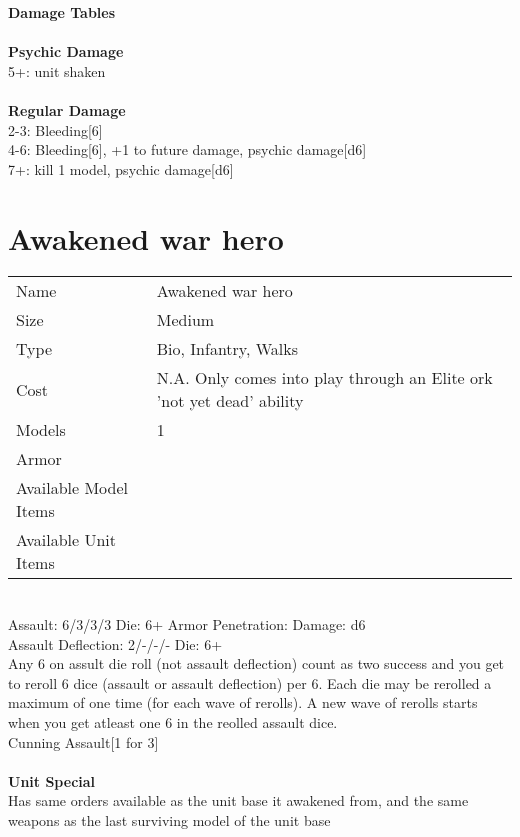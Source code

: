 {\bf Damage Tables} \\
\ \\ {\bf Psychic Damage } \\
5+: unit shaken \\
\ \\ {\bf Regular Damage } \\
2-3: Bleeding[6] \\
4-6: Bleeding[6], +1 to future damage, psychic damage[d6] \\
7+: kill 1 model, psychic damage[d6] \\









\pagebreak

\section{ Awakened war hero }

\begin{tabular}{ll}
  Name & Awakened war hero \\
  Size & Medium\\
  Type & Bio, Infantry, Walks\\
  Cost & N.A. Only comes into play through an Elite ork 'not yet dead' ability\\
  Models & 1\\
  Armor & \\
  Available Model Items &  \\
  Available Unit Items &  \\
\end{tabular}

\ \\
Assault: 6/3/3/3 Die: 6+ Armor Penetration:  Damage: d6 \\
Assault Deflection: 2/-/-/- Die: 6+\\
\indent Any 6 on assult die roll (not assault deflection) count as two success and you get to reroll 6 dice (assault or assault deflection) per 6. Each die may be rerolled a maximum of one time (for each wave of rerolls). A new wave of rerolls starts when you get atleast one 6 in the reolled assault dice.\\ Cunning Assault[1 for 3] \\
\ \\

{\bf Unit Special} \\
Has same orders available as the unit base it awakened from, and the same weapons as the last surviving model of the unit base
\ \\



